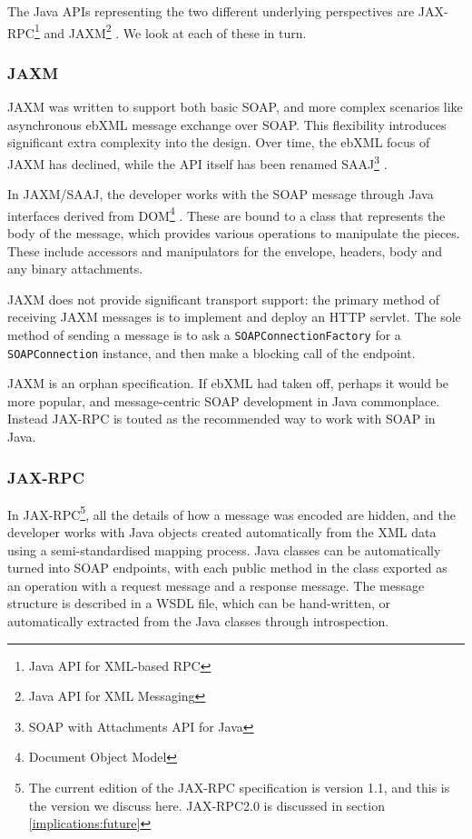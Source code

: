 The Java APIs representing the two different underlying perspectives
are JAX-RPC\footnote{Java API for XML-based RPC}
\cite{spec:JAX-RPC-11} and JAXM\footnote{Java API for XML Messaging}
\cite{spec:JAX-M-11}. We look at each of these in turn.

\subsubsection{JAXM}
\label{intro:jaxm}

JAXM was written to support both basic SOAP, and more complex
scenarios like asynchronous ebXML message exchange over SOAP. This
flexibility introduces significant extra complexity into the design.
Over time, the ebXML focus of JAXM has declined, while the API itself
has been renamed SAAJ\footnote{SOAP with Attachments API for Java}
\cite{spec:SAAJ-12}.

In JAXM/SAAJ, the developer works with the SOAP message through Java
interfaces derived from DOM\footnote{Document Object Model}
\cite{spec:DOM}. These are bound to a class that represents the body
of the message, which provides various operations to manipulate the
pieces. These include accessors and manipulators for the envelope,
headers, body and any binary attachments.

JAXM does not provide significant transport support: the primary
method of receiving JAXM messages is to implement and deploy an HTTP
servlet.  The sole method of sending a message is to ask a
{\tt SOAPConnectionFactory} for a {\tt SOAPConnection} instance, and
then make a blocking call of the endpoint.

JAXM is an orphan specification. If ebXML had taken off, perhaps it
would be more popular, and message-centric SOAP development in Java
commonplace. Instead JAX-RPC is touted as the recommended way to work
with SOAP in Java. 

\subsubsection{JAX-RPC}
\label{intro:jax-rpc}

In JAX-RPC\footnote{The current edition of the JAX-RPC specification
is version 1.1, and this is the version we discuss here. JAX-RPC2.0
is discussed in section \ref{implications:future}}, all the details of
how a message was encoded are hidden, and the developer works with
Java objects created automatically from the XML data using a
semi-standardised mapping process. Java classes can be automatically
turned into SOAP endpoints, with each public method in the class
exported as an operation with a request message and a response
message. The message structure is described in a WSDL file, which can
be hand-written, or automatically extracted from the Java classes
through introspection.

